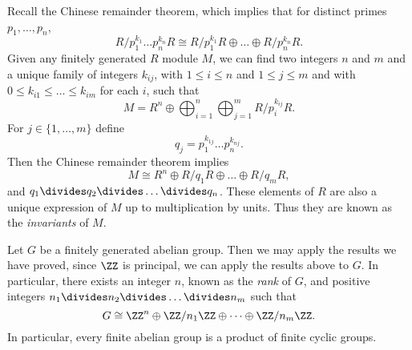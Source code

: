 Recall the Chinese remainder theorem, which implies that for distinct primes $p_1,\dots,p_n$,
%
\[ R/p_1^{k_1}\dots p_n^{k_n} R \cong R/p_1^{k_1}R \oplus \dots \oplus R/p_n^{k_n}R. \]
%
Given any finitely generated $R$ module $M$, we can find two integers $n$ and $m$ and a unique family of integers $k_{ij}$, with $1 \leq i \leq n$ and $1 \leq j \leq m$ and with $0 \leq k_{i1} \leq \dots \leq k_{im}$ for each $i$, such that
%
\[ M = R^n \oplus \bigoplus_{i = 1}^n \bigoplus_{j = 1}^m R/p_i^{k_{ij}}R. \]
%
For $j \in \{ 1, \dots, m \}$ define
%
\[ q_j = p_1^{k_{1j}} \dots p_n^{k_{nj}}. \]
%
Then the Chinese remainder theorem implies
%
\[ M \cong R^n \oplus R/q_1R \oplus \dots \oplus R/q_mR, \]
%
and $q_1 \divides q_2 \divides \dots \divides q_n$. These elements of $R$ are also a unique expression of $M$ up to multiplication by units. Thus they are known as the \emph{invariants} of $M$.

\begin{example}
    Let $G$ be a finitely generated abelian group. Then we may apply the results we have proved, since $\ZZ$ is principal, we can apply the results above to $G$. In particular, there exists an integer $n$, known as the \emph{rank} of $G$, and positive integers $n_1 \divides n_2 \divides \dots \divides n_m$ such that
    \[ G \cong \ZZ^n \oplus \ZZ/n_1 \ZZ \oplus \dots \oplus \ZZ / n_m \ZZ. \]
    In particular, every finite abelian group is a product of finite cyclic groups.
\end{example}

